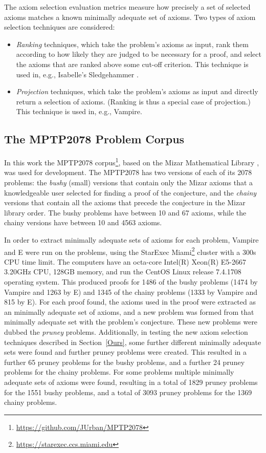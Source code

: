 \documentclass[EPiC]{easychair}
\begin{document}
The axiom selection evaluation metrics measure how precisely a set of
selected axioms matches a known minimally adequate set of axioms.
Two types of axiom selection techniques are considered:
\begin{itemize}
\item \emph{Ranking} techniques, which take the problem's axioms as input, 
      rank them according to how likely they are judged to be necessary for 
      a proof, and select the axioms that are ranked above some cut-off
      criterion.
      This technique is used in, e.g., Isabelle's Sledgehammer \cite{PB10}.
\item \emph{Projection} techniques, which take the problem's axioms as input 
      and directly return a selection of axioms.
      (Ranking is thus a special case of projection.)
      This technique is used in, e.g., Vampire.
\end{itemize}

\subsection{The MPTP2078 Problem Corpus}
\label{MPTP2078}

In this work the MPTP2078 corpus\footnote{%
\url{https://github.com/JUrban/MPTP2078}}, based on the Mizar Mathematical
Library \cite{Rud92}, was used for development.
The MPTP2078 has two versions of each of its 2078 problems: 
the \emph{bushy} (small) versions that contain only the Mizar axioms that a
knowledgeable user selected for finding a proof of the conjecture, and 
the \emph{chainy} versions that contain all the axioms that precede the 
conjecture in the Mizar library order.
The bushy problems have between 10 and 67 axioms, while the chainy versions
have between 10 and 4563 axioms.

In order to extract minimally adequate sets of axioms for each problem, Vampire
and E \cite{SCV19} were run on the problems, using the StarExec \cite{SST14}
Miami\footnote{%
\url{https://starexec.ccs.miami.edu}}
cluster with a 300s CPU time limit.
The computers have an octa-core Intel(R) Xeon(R) E5-2667 3.20GHz CPU,
128GB memory, and run the CentOS Linux release 7.4.1708 operating system.
This produced proofs for 1486 of the bushy problems (1474 by Vampire and 1263
by E) and 1345 of the chainy problems (1333 by Vampire and 815 by E).
For each proof found, the axioms used in the proof were extracted as an
minimally adequate set of axioms, and a new problem was formed from that 
minimally adequate set with the problem's conjecture.
These new problems were dubbed the \emph{pruney} problems.
Additionally, in testing the new axiom selection techniques described in 
Section~\ref{Ours}, some further different minimally adequate sets were found 
and further pruney problems were created.
This resulted in a further 65 pruney problems for the bushy problems, and
a further 24 pruney problems for the chainy problems.
For some problems multiple minimally adequate sets of axioms were found, 
resulting in a total of 1829 pruney problems for the 1551 bushy problems, 
and a total of 3093 pruney problems for the 1369 chainy problems.
\end{document}
